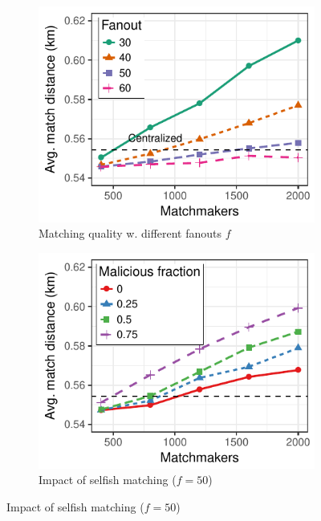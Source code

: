 \begin{figure}[t]
	\centering
	\begin{subfigure}{.5\columnwidth}
		\centering
		\includegraphics[width=\linewidth]{match/assets/plots/taxi_quality.pdf}
		\caption{Matching quality w. different fanouts $ f $}
		\label{fig:taxi_quality}
	\end{subfigure}%
	\begin{subfigure}{.5\columnwidth}
		\centering
		\includegraphics[width=\columnwidth]{match/assets/plots/taxi_fairness_fixed.pdf}
		\caption{Impact of selfish matching ($ f = 50 $)}
		\label{fig:taxi_fairness_fixed}
	\end{subfigure}

\end{figure}

